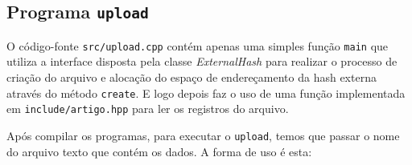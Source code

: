 \subsection{Programa \texttt{upload}}\label{subsec:programa_upload}

O código-fonte \texttt{src/upload.cpp} contém apenas uma simples função \texttt{main} que utiliza a interface disposta pela classe \emph{ExternalHash} para realizar o processo de criação do arquivo e alocação do espaço de endereçamento da hash externa através do método \texttt{create}. E logo depois faz o uso de uma função implementada em \texttt{include/artigo.hpp} para ler os registros do arquivo.

Após compilar os programas, para executar o \texttt{upload}, temos que passar o nome do arquivo texto que contém os dados. A forma de uso é esta:
